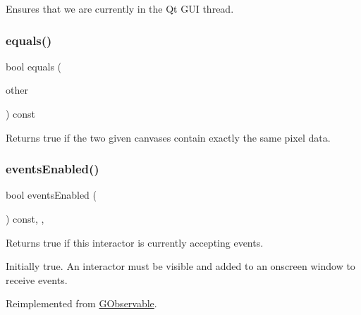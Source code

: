 Ensures that we are currently in the Qt G\+UI thread. 

\mbox{\label{classsgl_1_1GCanvas_a7cf0de4c4124b7de747b9cc17edd6ab9}} 
\subsubsection{\texorpdfstring{equals()}{equals()}}
{\footnotesize\ttfamily bool equals (\begin{DoxyParamCaption}\item[{const \mbox{\hyperlink{classsgl_1_1GCanvas}{G\+Canvas}} \&}]{other }\end{DoxyParamCaption}) const\hspace{0.3cm}{\ttfamily [virtual]}}



Returns true if the two given canvases contain exactly the same pixel data. 

\mbox{\label{classsgl_1_1GInteractor_a597a370b592e3737d38d9d2f4e2031ea}} 
\subsubsection{\texorpdfstring{events\+Enabled()}{eventsEnabled()}}
{\footnotesize\ttfamily bool events\+Enabled (\begin{DoxyParamCaption}{ }\end{DoxyParamCaption}) const\hspace{0.3cm}{\ttfamily [override]}, {\ttfamily [virtual]}, {\ttfamily [inherited]}}



Returns true if this interactor is currently accepting events. 

Initially true. An interactor must be visible and added to an onscreen window to receive events. 

Reimplemented from \mbox{\hyperlink{classsgl_1_1GObservable_a8ebb3da91032e7f4c34485dabc518b8a}{G\+Observable}}.

\mbox{\label{classsgl_1_1GCanvas_acaf90d64e4fea8f776e722976aeb5070}} 
